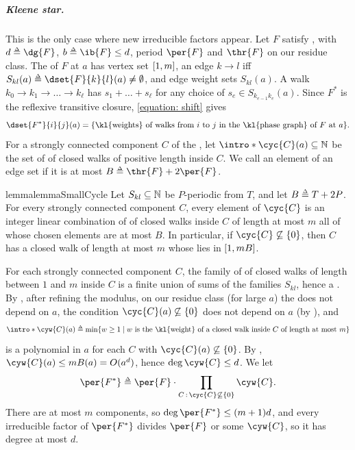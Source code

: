 \subparagraph*{Kleene star.}
This is the only case where new irreducible factors appear.
Let $F$ satisfy , with $d \defeq \dg{F}$, $b \defeq \ib{F} \le d$, period $\per{F}$ and  $\thr{F}$ on our residue class.
\AP The  of $F$ at $a$ has vertex set $[1, m]$, an edge $k \to l$ iff $S_{kl}(a) \defeq \dset{F}{k}{l}(a) \neq \emptyset$, and edge weight sets $S_{kl}(a)$.
\AP A walk $k_0 \to k_1 \to \dots \to k_{\ell}$ has  $s_1 + \dots + s_{\ell}$ for any choice of $s_{e} \in S_{k_{e-1} k_{e}}(a)$.
Since $F^{*}$ is the reflexive transitive closure, \eqref{equation: shift} gives
\begin{equation}
    \dset{F^{*}}{i}{j}(a) = \set{\text{\kl{weights} of walks from } i \text{ to } j \text{ in the \kl{phase graph} of } F \text{ at } a}. \label{equation: star walks}
\end{equation}
\AP For a strongly connected component $C$ of the , let $\intro*\cyc{C}(a) \subseteq \nat$ be the set of  of closed walks of positive length inside $C$.
\AP We call an element of an edge set  if it is at most $B \defeq \thr{F} + 2 \per{F}$.
\begin{restatable}{lemma}{lemmaSmallCycle}\label{lemma: small cycle}
    Let $S_{kl} \subseteq \mathbb{N}$ be $P$-periodic from $T$, and let $B \defeq T + 2P$.
    For every strongly connected component $C$, every element of $\cyc{C}$ is an integer linear combination of  of closed walks inside $C$ of length at most $m$ all of whose chosen elements are at most $B$.
    In particular, if $\cyc{C} \not\subseteq \set{0}$, then $C$ has a closed walk of length at most $m$ whose  lies in $[1, m B]$.
\end{restatable}

For each strongly connected component $C$, the family of  of closed walks of length between $1$ and $m$ inside $C$ is a finite union of sums of the families $S_{kl}$, hence a .
By , after refining the modulus, on our residue class (for large $a$) the  does not depend on $a$, the condition $\cyc{C}(a) \not\subseteq \set{0}$ does not depend on $a$ (by ), and
\[\intro*\cyw{C}(a) \defeq \min \set{w \ge 1 \mid w \text{ is the \kl{weight} of a closed walk inside } C \text{ of length at most } m}\]
is a polynomial in $a$ for each $C$ with $\cyc{C}(a) \not\subseteq \set{0}$.
By , $\cyw{C}(a) \le m B(a) = O(a^{d})$, hence $\deg \cyw{C} \le d$.
We let
\[\per{F^{*}} \defeq \per{F} \cdot \prod_{C \,:\, \cyc{C} \not\subseteq \set{0}} \cyw{C}.\]
There are at most $m$ components, so $\deg \per{F^{*}} \le (m + 1) d$, and every irreducible factor of $\per{F^{*}}$ divides $\per{F}$ or some $\cyw{C}$, so it has degree at most $d$.

